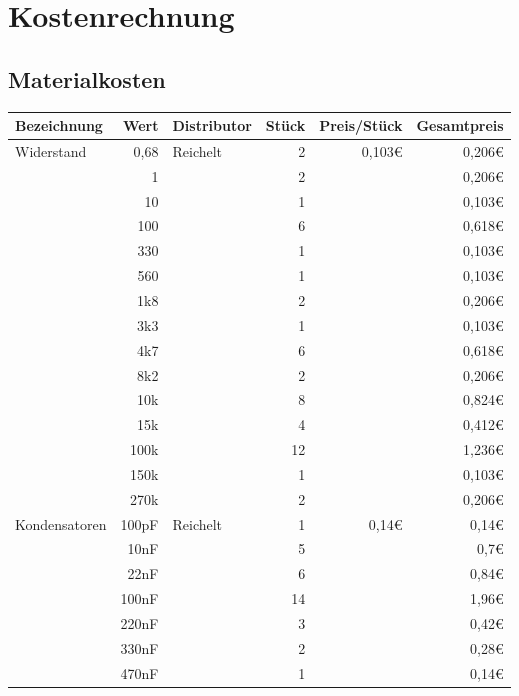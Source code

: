 \section{Kostenrechnung}	
\subsection{Materialkosten}
\let\texteuro\euro %
\begin{table} [H]
\begin{tabularx}{\textwidth}{p{}|r|X|r|r|r}
	Bezeichnung & Wert & Distributor& Stück & Preis/Stück & Gesamtpreis\\
	\hline
	\multirow{15}{*}{Widerstand}
	& 0,68	& \multirow{15}{*}{Reichelt} & 2 & \multirow{15}{*}{0,103€} & 0,206€ \\
	& 1		& 							 & 2 & 						& 0,206€ \\
	& 10	& 							 & 1 & 						& 0,103€ \\
	& 100	& 							 & 6 & 						& 0,618€ \\
	& 330	& 							 & 1 & 						& 0,103€ \\
	& 560	&							 & 1 & 						& 0,103€ \\
	& 1k8	& 							 & 2 & 						& 0,206€ \\
	& 3k3	& 							 & 1 & 						& 0,103€ \\
	& 4k7	& 							 & 6 & 						& 0,618€ \\
	& 8k2	& 							 & 2 & 						& 0,206€ \\
	& 10k	& 							 & 8 & 						& 0,824€ \\
	& 15k	&							 & 4 & 						& 0,412€ \\
	& 100k	& 							 & 12 & 					& 1,236€ \\
	& 150k	& 							 & 1 & 						& 0,103€ \\
	& 270k	& 							 & 2 & 						& 0,206€ \\
	\hline
	\multirow{7}{*}{Kondensatoren}
	& 100pF	& \multirow{7}{*}{Reichelt}  & 1 & \multirow{7}{*}{0,14€}& 0,14€ \\
	& 10nF	& 							 & 5 & 						& 0,7€ \\
	& 22nF	& 							 & 6 & 						& 0,84€ \\
	& 100nF	& 							 & 14 & 					& 1,96€ \\
	& 220nF	& 							 & 3 & 						& 0,42€ \\
	& 330nF	& 							 & 2 & 						& 0,28€ \\
	& 470nF	& 							 & 1 & 						& 0,14€ \\
	

\end{tabularx}
\end{table}
